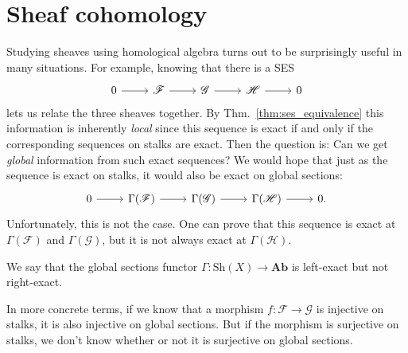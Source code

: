 \section{Sheaf cohomology}
Studying sheaves using homological algebra turns out to be surprisingly
useful in many situations. For example, knowing that there is a SES
\[
  \begin{tikzcd}
    0 \arrow{r} & \mathscr{F} \arrow{r} & \mathscr{G} \arrow{r} &
    \mathscr{H} \arrow{r} & 0
  \end{tikzcd}
\]
lets us relate the three sheaves together. By Thm.~\ref{thm:ses_equivalence}
this information is inherently \emph{local} since this sequence is exact
if and only if the corresponding sequences on stalks are exact.
Then the question is: Can we get \emph{global} information from
such exact sequences? We would hope that just as the sequence is exact
on stalks, it would also be exact on global sections:
\[
\begin{tikzcd}
  0 \arrow{r} & \Gamma(\mathscr{F}) \arrow{r} & \Gamma(\mathscr{G})
  \arrow{r} & \Gamma(\mathscr{H}) \arrow{r} & 0.
\end{tikzcd}
\]
Unfortunately, this is not the case. One can prove that this sequence
is exact at $\Gamma(\mathscr{F})$ and $\Gamma(\mathscr{G})$, but it
is not always exact at $\Gamma(\mathscr{H})$.
\begin{cat}
  We say that the global sections functor $\Gamma: \text{Sh}(X)\to \textbf{Ab}$ is left-exact but not right-exact.
\end{cat}
In more concrete terms, if we know that a morphism $f: \mathscr{F}
\to\mathscr{G}$ is injective on stalks, it is also injective on
global sections. But if the morphism is surjective on stalks, we don't
know whether or not it is surjective on global sections.

